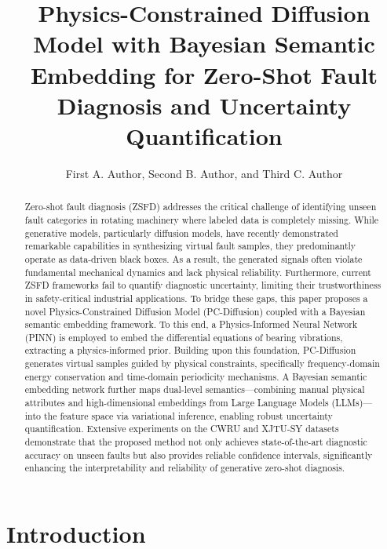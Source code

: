 \documentclass[journal]{IEEEtran}
\begin{document}
\title{Physics-Constrained Diffusion Model with Bayesian Semantic Embedding for Zero-Shot Fault Diagnosis and Uncertainty Quantification}

\author{First A. Author, Second B. Author, and Third C. Author}

\maketitle

\begin{abstract}
Zero-shot fault diagnosis (ZSFD) addresses the critical challenge of identifying unseen fault categories in rotating machinery where labeled data is completely missing. While generative models, particularly diffusion models, have recently demonstrated remarkable capabilities in synthesizing virtual fault samples, they predominantly operate as data-driven black boxes. As a result, the generated signals often violate fundamental mechanical dynamics and lack physical reliability. Furthermore, current ZSFD frameworks fail to quantify diagnostic uncertainty, limiting their trustworthiness in safety-critical industrial applications. To bridge these gaps, this paper proposes a novel Physics-Constrained Diffusion Model (PC-Diffusion) coupled with a Bayesian semantic embedding framework. To this end, a Physics-Informed Neural Network (PINN) is employed to embed the differential equations of bearing vibrations, extracting a physics-informed prior. Building upon this foundation, PC-Diffusion generates virtual samples guided by physical constraints, specifically frequency-domain energy conservation and time-domain periodicity mechanisms. A Bayesian semantic embedding network further maps dual-level semantics—combining manual physical attributes and high-dimensional embeddings from Large Language Models (LLMs)—into the feature space via variational inference, enabling robust uncertainty quantification. Extensive experiments on the CWRU and XJTU-SY datasets demonstrate that the proposed method not only achieves state-of-the-art diagnostic accuracy on unseen faults but also provides reliable confidence intervals, significantly enhancing the interpretability and reliability of generative zero-shot diagnosis.
\end{abstract}
\section{Introduction}
\label{sec:intro}
\end{document}

